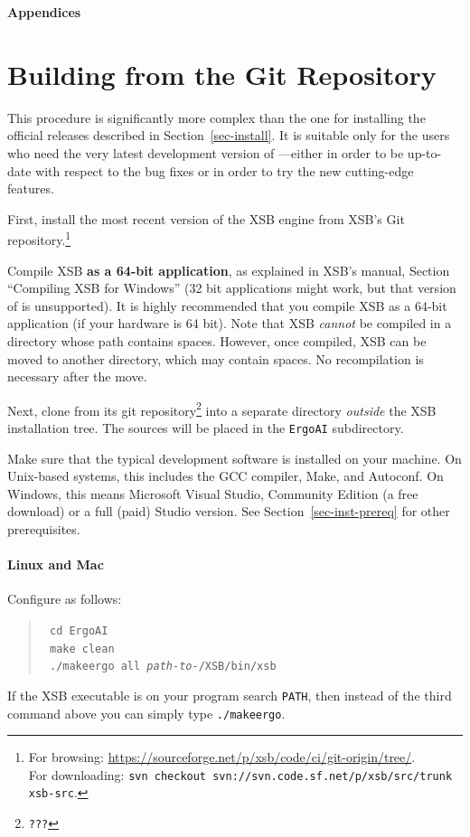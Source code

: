 \documentclass[11pt]{article}
\newcommand{\ERGO}{\mbox{\smaller{\ensuremath{\cal{E}}\smaller{{\sc{RGO}}}}}\xspace}
\newcommand{\FLSYSTEM}{\ERGO}
\begin{document}
\appendix

\newpage

\noindent
{\LARGE\bf Appendices}

\section{Building \FLSYSTEM from the Git Repository}
\label{app-building-ergo}

This procedure is significantly more complex than the one for installing
the official \FLSYSTEM releases described in Section~\ref{sec-install}. It is suitable only for the
users who need the very latest development version of \FLSYSTEM---either in
order to be up-to-date with respect to the bug fixes or in
order to try the new cutting-edge features.

First, install the most recent version of the XSB engine from
XSB's Git repository.\footnote{
  For browsing:
  \url{https://sourceforge.net/p/xsb/code/ci/git-origin/tree/}.
  \\
  \hspace*{7mm}For downloading:
  \texttt{svn~checkout~svn://svn.code.sf.net/p/xsb/src/trunk xsb-src}.
  }


Compile XSB \textbf{as a 64-bit application}, as explained in XSB's manual,
Section ``Compiling XSB for Windows''
(32 bit applications might work, but that version of \ERGO is unsupported).
It is highly recommended that you compile XSB as a 64-bit application (if
your hardware is 64 bit).
Note that XSB \emph{cannot} be compiled in a directory whose path contains
spaces.  However, once compiled, XSB can be moved to another directory,
which may contain spaces. No recompilation is necessary after the move.

\sloppy
Next, clone \FLSYSTEM from its git repository\footnote{
\texttt{???}
}
into a
separate directory \emph{outside} the XSB installation tree.  The \FLSYSTEM
sources will be placed in the {\tt ErgoAI} subdirectory.

Make sure that the typical development software is installed on your
machine. On Unix-based systems, this includes the GCC compiler, Make, and
Autoconf. On Windows, this means Microsoft Visual Studio, Community Edition
(a free download) or a full (paid) Studio version.
See Section~\ref{sec-inst-prereq} for other prerequisites.

\paragraph{Linux and Mac}
Configure \FLSYSTEM as follows:
\begin{quote}
  \tt
   cd ErgoAI\\
   \tt
   make clean\\
   \tt
   ./makeergo all \textnormal{\emph{path-to-}}/XSB/bin/xsb
\end{quote}
If the XSB executable is on your program search {\tt PATH}, then instead of the
third command above you can simply type
\texttt{./makeergo}. 
\end{document}
